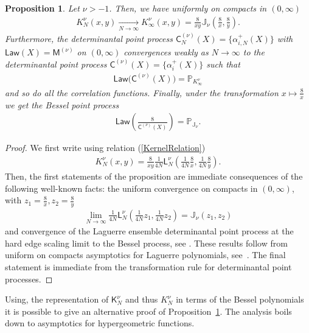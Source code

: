 \documentclass[pdftex]{sigma}
\numberwithin{equation}{section}
\newtheorem{Proposition}[Theorem]{Proposition}
{ \theoremstyle{definition}
\newtheorem{Definition}[Theorem]{Definition}
\newtheorem{Remark}[Theorem]{Remark} }
\begin{document}
\begin{Proposition}\label{PropositionLimitCorrelationAlphaPlus}
Let $\nu>-1$. Then, we have uniformly on compacts in $(0,\infty)$
\begin{gather*}
K_N^{\nu}(x,y)\underset{N\to \infty}{\longrightarrow}K_\infty^{\nu}(x,y)=\frac{8}{xy}\mathbb{J}_{\nu}\left(\frac{8}{x},\frac{8}{y}\right).
\end{gather*}
Furthermore, the determinantal point process $\mathsf{C}^{(\nu)}_{N}(X)=\{\alpha_{i,N}^+(X) \}$ with $\mathsf{Law}(X)=\mathsf{M}^{(\nu)}$ on $(0,\infty)$ convergences weakly as $N \to \infty$ to the determinantal point process $\mathsf{C}^{(\nu)}(X)=\{ \alpha_{i}^+(X) \}$ such that
\begin{gather*}
\mathsf{Law}\big(\mathsf{C}^{(\nu)}(X)\big)=\mathbb{P}_{K_{\infty}^{\nu}}
\end{gather*}
and so do all the correlation functions.
Finally, under the transformation $x \mapsto \frac{8}{x}$ we get the Bessel point process
\begin{gather*}
\mathsf{Law}\left(\frac{8}{\mathsf{C}^{(\nu)}(X)}\right)=\mathbb{P}_{\mathbb{J}_{\nu}}.
\end{gather*}
\end{Proposition}

\begin{proof}
We first write using relation (\ref{KernelRelation})
\begin{gather*}
K_N^{\nu}(x,y)=\frac{8}{xy}\frac{1}{4N}\mathsf{L}_{N}^{\nu}\left(\frac{1}{4N}\frac{8}{x},\frac{1}{4N}\frac{8}{y}\right).
\end{gather*}
Then, the first statements of the proposition are immediate consequences of the following well-known facts: the uniform convergence on compacts in $(0,\infty)$, with $z_1=\frac{8}{x}, z_2=\frac{8}{y}$
\begin{gather*}
\lim_{N \to \infty}\frac{1}{4N}\mathsf{L}_N^{\nu}\left(\frac{1}{4N}z_1,\frac{1}{4N}z_2\right)=\mathbb{J}_{\nu}(z_1,z_2)
\end{gather*}
and convergence of the Laguerre ensemble determinantal point process at the hard edge scaling limit to the Bessel process, see \cite{ForresterBessel,Forrester, TracyWidom}. These results follow from uniform on compacts asymptotics for Laguerre polynomials, see~\cite{Szego}. The final statement is immediate from the transformation rule for determinantal point processes.
\end{proof}

\begin{Remark}Using, the representation of $\mathsf{K}_N^{\nu}$ and thus $K_N^\nu$ in terms of the Bessel polynomials it is possible to give an alternative proof of Proposition~\ref{PropositionLimitCorrelationAlphaPlus}. The analysis boils down to asymptotics for hypergeometric functions.
\end{Remark}
\end{document}
